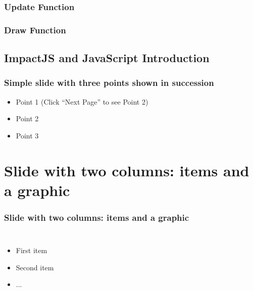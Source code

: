 \documentclass[red]{beamer}
\begin{document}
\begin{frame}
	\frametitle{Update Function}
		\lstlll
\end{frame}
	
\begin{frame}
	\frametitle{Draw Function}
		\lstllll
\end{frame}

\subsection{ImpactJS and JavaScript Introduction}

\begin{frame}
  \frametitle{Simple slide with three points shown in succession}   %

  \begin{itemize}
  \item<1-> Point 1 (Click ``Next Page'' to see Point 2) %
  \item<2-> Point 2  %
  \item<3-> Point 3
  \end{itemize}
\end{frame}



\section{Slide with two columns: items and a graphic}

\begin{frame}
  \frametitle{Slide with two columns: items and a graphic}   %
  \begin{columns}[c]
  \column{2in}  %
  \begin{itemize}
  \item<1-> First item
  \item<2-> Second item
  \item<3-> ...
  \end{itemize}
  \column{2in}
  \end{columns}
\end{frame}
\end{document}
